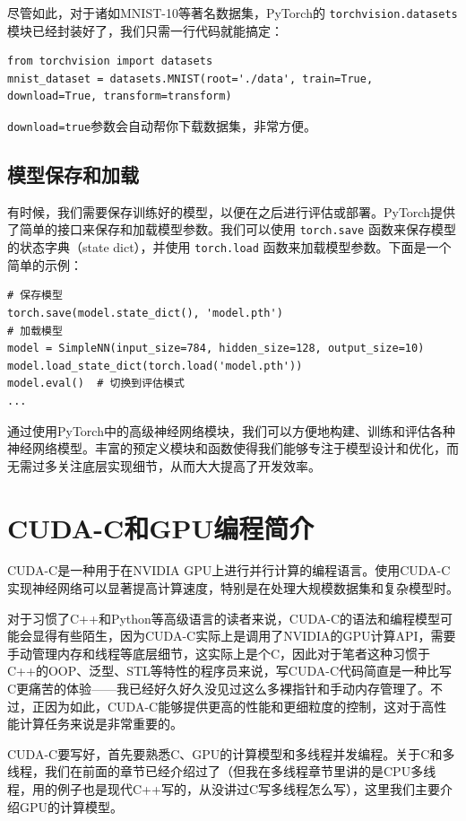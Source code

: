尽管如此，对于诸如MNIST-10等著名数据集，PyTorch的 \verb|torchvision.datasets| 模块已经封装好了，我们只需一行代码就能搞定：
\begin{verbatim}
from torchvision import datasets
mnist_dataset = datasets.MNIST(root='./data', train=True, download=True, transform=transform)
\end{verbatim}
\verb|download=true|参数会自动帮你下载数据集，非常方便。

\subsection{模型保存和加载}

有时候，我们需要保存训练好的模型，以便在之后进行评估或部署。PyTorch提供了简单的接口来保存和加载模型参数。我们可以使用 \verb|torch.save| 函数来保存模型的状态字典（state dict），并使用 \verb|torch.load| 函数来加载模型参数。下面是一个简单的示例：
\begin{verbatim}
# 保存模型
torch.save(model.state_dict(), 'model.pth')
# 加载模型
model = SimpleNN(input_size=784, hidden_size=128, output_size=10)
model.load_state_dict(torch.load('model.pth'))
model.eval()  # 切换到评估模式
...
\end{verbatim}

通过使用PyTorch中的高级神经网络模块，我们可以方便地构建、训练和评估各种神经网络模型。丰富的预定义模块和函数使得我们能够专注于模型设计和优化，而无需过多关注底层实现细节，从而大大提高了开发效率。

\section{CUDA-C和GPU编程简介}

CUDA-C是一种用于在NVIDIA GPU上进行并行计算的编程语言。使用CUDA-C实现神经网络可以显著提高计算速度，特别是在处理大规模数据集和复杂模型时。

对于习惯了C++和Python等高级语言的读者来说，CUDA-C的语法和编程模型可能会显得有些陌生，因为CUDA-C实际上是调用了NVIDIA的GPU计算API，需要手动管理内存和线程等底层细节，这实际上是个C，因此对于笔者这种习惯于C++的OOP、泛型、STL等特性的程序员来说，写CUDA-C代码简直是一种比写C更痛苦的体验——我已经好久好久没见过这么多裸指针和手动内存管理了。不过，正因为如此，CUDA-C能够提供更高的性能和更细粒度的控制，这对于高性能计算任务来说是非常重要的。

CUDA-C要写好，首先要熟悉C、GPU的计算模型和多线程并发编程。关于C和多线程，我们在前面的章节已经介绍过了（但我在多线程章节里讲的是CPU多线程，用的例子也是现代C++写的，从没讲过C写多线程怎么写），这里我们主要介绍GPU的计算模型。

